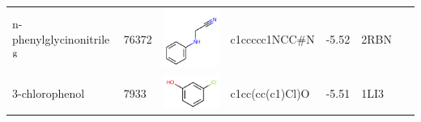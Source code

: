 \documentclass[aps,pre,twocolumn,nofootinbib,superscriptaddress,10pt, final,tightenlines]{revtex4-1}
\begin{document}
\begin{table}
\begin{center}
\begin{tabular}{llp{2cm}>{\ttfamily}lS[table-format=-1.2, table-figures-uncertainty=1]ll}
n-phenylglycinonitrile$^{\rm g}$   & 76372                                & \parbox[c]{1em}{\includegraphics[scale=0.2]{figures/76372.pdf}}    & c1ccccc1NCC\#N                       & -5.52                                            & 2RBN~\cite{boyce_predicting_2009} & \cite{boyce_predicting_2009}  \\ 
3-chlorophenol                     & 7933                                 & \parbox[c]{1em}{\includegraphics[scale=0.2]{figures/7933.pdf}}     & c1cc(cc(c1)Cl)O                      & -5.51                                                   & 1LI3~\cite{wei_model_2002}        & \cite{wei_model_2002}         \\ 

\end{tabular}
\end{center}
\end{table}
\end{document}
